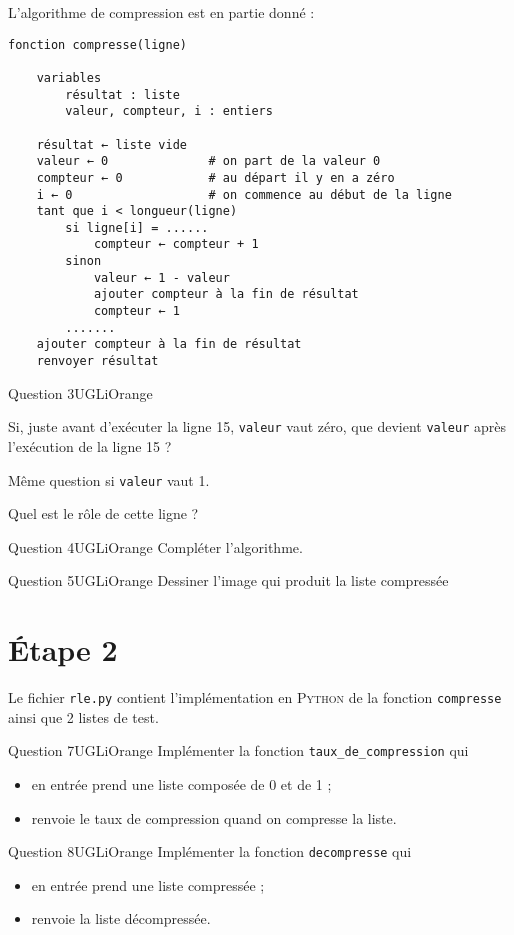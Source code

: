 L'algorithme de compression est en partie donné :
\newpage


\begin{verbatim}
fonction compresse(ligne)

    variables
        résultat : liste
        valeur, compteur, i : entiers
        
    résultat ← liste vide
    valeur ← 0              # on part de la valeur 0
    compteur ← 0            # au départ il y en a zéro
    i ← 0                   # on commence au début de la ligne
    tant que i < longueur(ligne)
        si ligne[i] = ......
            compteur ← compteur + 1
        sinon
            valeur ← 1 - valeur
            ajouter compteur à la fin de résultat
            compteur ← 1
        .......
    ajouter compteur à la fin de résultat
    renvoyer résultat
\end{verbatim}

\begin{encadrecolore}{Question 3}{UGLiOrange}
\begin{enumalph}
	\item Si, juste avant d'exécuter la ligne 15, \texttt{valeur} vaut zéro, que devient \texttt{valeur} après l'exécution de la ligne 15 ?
    \item Même question si \texttt{valeur} vaut 1.
    \item Quel est le rôle de cette ligne ?
\end{enumalph}
\end{encadrecolore}


\begin{encadrecolore}{Question 4}{UGLiOrange}
Compléter l'algorithme.
\end{encadrecolore}


\begin{encadrecolore}{Question 5}{UGLiOrange}
Dessiner l'image qui produit la liste compressée
\end{encadrecolore}


\section*{\'Etape 2}

Le fichier \texttt{rle.py} contient l'implémentation en \textsc{Python} de la fonction \texttt{compresse} ainsi que 2 listes de test.


\begin{encadrecolore}{Question 7}{UGLiOrange}
Implémenter la fonction \texttt{taux\_de\_compression} qui
\begin{itemize}
	\item en entrée prend une liste composée de 0 et de 1 ;
    \item renvoie le taux de compression quand on compresse la liste.
\end{itemize}
\end{encadrecolore}


\begin{encadrecolore}{Question 8}{UGLiOrange}
Implémenter la fonction \texttt{decompresse} qui
\begin{itemize}
	\item en entrée prend une liste compressée ;
    \item renvoie la liste décompressée.
\end{itemize}
\end{encadrecolore}

